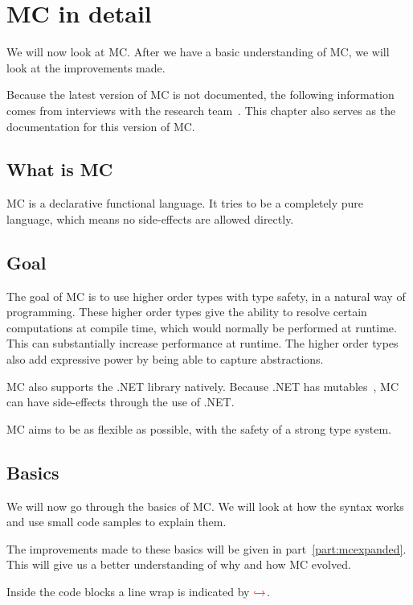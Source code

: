\chapter{MC in detail}\label{chap:basicmc}
We will now look at MC.
After we have a basic understanding of MC, we will look at the improvements made.

Because the latest version of MC is not documented, the following information comes from interviews with the research team~\cite{researchteaminterview}.
This chapter also serves as the documentation for this version of MC.


\section{What is MC}
MC is a declarative functional language.
It tries to be a completely pure language, which means no side-effects are allowed directly.


\section{Goal}
The goal of MC is to use higher order types with type safety, in a natural way of programming.
These higher order types give the ability to resolve certain computations at compile time, which would normally be performed at runtime.
This can substantially increase performance at runtime.
The higher order types also add expressive power by being able to capture abstractions.

MC also supports the .NET library natively.
Because .NET has mutables~\cite{dotnetdescription}, MC can have side-effects through the use of .NET.

MC aims to be as flexible as possible, with the safety of a strong type system.


\section{Basics}
We will now go through the basics of MC.
We will look at how the syntax works and use small code samples to explain them.

The improvements made to these basics will be given in part~\ref{part:mcexpanded}.
This will give us a better understanding of why and how MC evolved.

Inside the code blocks a line wrap is indicated by \ensuremath{\color{red}\hookrightarrow\space}.


